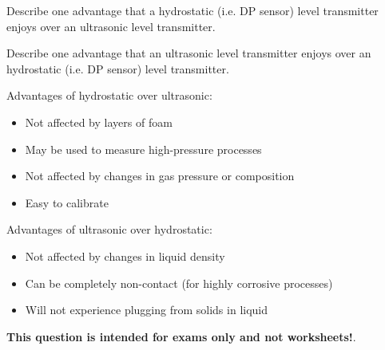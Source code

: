 

Describe one advantage that a hydrostatic (i.e. DP sensor) level transmitter enjoys over an ultrasonic level transmitter.

\vskip 50pt

Describe one advantage that an ultrasonic level transmitter enjoys over an hydrostatic (i.e. DP sensor) level transmitter.

\vskip 50pt







Advantages of hydrostatic over ultrasonic: 

\begin{itemize}
\item{} Not affected by layers of foam
\item{} May be used to measure high-pressure processes
\item{} Not affected by changes in gas pressure or composition
\item{} Easy to calibrate
\end{itemize}

\vskip 10pt

Advantages of ultrasonic over hydrostatic:

\begin{itemize}
\item{} Not affected by changes in liquid density
\item{} Can be completely non-contact (for highly corrosive processes)
\item{} Will not experience plugging from solids in liquid
\end{itemize}







{\bf This question is intended for exams only and not worksheets!}.


